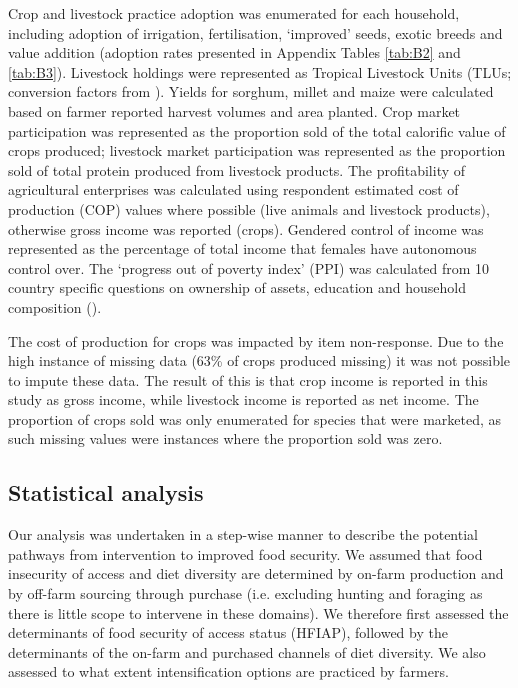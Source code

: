 Crop and livestock practice adoption was enumerated for each household, including adoption of irrigation, fertilisation, `improved' seeds, exotic breeds and value addition (adoption rates presented in Appendix Tables \ref{tab:B2} and \ref{tab:B3}). Livestock holdings were represented as Tropical Livestock Units (TLUs; conversion factors from \citealp{Njuki2011a}). Yields for sorghum, millet and maize were calculated based on farmer reported harvest volumes and area planted. Crop market participation was represented as the proportion sold of the total calorific value of crops produced; livestock market participation was represented as the proportion sold of total protein produced from livestock products. The profitability of agricultural enterprises was calculated using respondent estimated cost of production (COP) values where possible (live animals and livestock products), otherwise gross income was reported (crops). Gendered control of income was represented as the percentage of total income that females have autonomous control over. The `progress out of poverty index' (PPI) was calculated from 10 country specific questions on ownership of assets, education and household composition (\citealp{Schreiner2011}).

The cost of production for crops was impacted by item non-response. Due to the high instance of missing data (63\% of crops produced missing) it was not possible to impute these data. The result of this is that crop income is reported in this study as gross income, while livestock income is reported as net income. The proportion of crops sold was only enumerated for species that were marketed, as such missing values were instances where the proportion sold was zero.

\subsection{Statistical analysis}

Our analysis was undertaken in a step-wise manner to describe the potential pathways from intervention to improved food security. We assumed that food insecurity of access and diet diversity are determined by on-farm production and by off-farm sourcing through purchase (i.e. excluding hunting and foraging as there is little scope to intervene in these domains). We therefore first assessed the determinants of food security of access status (HFIAP), followed by the determinants of the on-farm and purchased channels of diet diversity. We also assessed to what extent intensification options are practiced by farmers.

